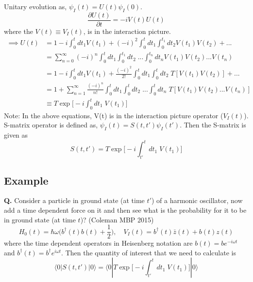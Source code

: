 \documentclass{article}
\begin{document}
Unitary evolution as, $\psi_I(t) = U(t) \psi_I(0)$.\\
\begin{equation}
    \frac{\partial U(t)}{\partial t} = -iV(t) U(t)
\end{equation}
where the $V(t) \equiv V_I (t)$, is in the interaction picture. 
\begin{equation}
\begin{split}
     \implies U(t) &= 1-i\int_0^t dt_1 V(t_1) +(-i)^2 \int_0^t dt_1 \int_0^{t_1} dt_2 V(t_1)  V(t_2)+... \\&= \sum_{n=0}^{\infty} (-i)^n \int_0^{t}dt_1\int_0^{t_1}dt_2 \; ... \int_0^{t_n}dt_n V(t_1)  V(t_2)... V(t_n) \\
     &= 1-i\int_0^t dt_1 V(t_1) +\frac{(-i)^2}{2!} \int_0^t dt_1 \int_0^{t} dt_2 \; T[V(t_1)  V(t_2)]+... \\&=1 + \sum_{n=1}^{\infty} \frac{(-i)^n}{n!} \int_0^{t}dt_1\int_0^{t}dt_2 \; ... \int_0^{t}dt_n \; T[V(t_1)  V(t_2)... V(t_n)] \\ &\equiv T\exp \bigg[-i\int_0^t dt_1\; V(t_1)\bigg]
\end{split}
\end{equation}
Note: In the above equations, V(t) is in the interaction picture operator ($V_I(t)$).\\
S-matrix operator is defined as,  $\psi_I(t) = S(t,t') \psi_I(t')$. Then the S-matrix is given as
\begin{equation}
	S(t,t') = T\exp \bigg[-i\int_{t'}^t dt_1\; V(t_1)\bigg]
\end{equation}

\subsection{Example}
\textbf{Q.} Consider a particle in ground state (at time $t'$) of a harmonic oscillator, now add a time dependent force on it and then see what is the probability for it to be in ground state (at time $t$)? (Coleman MBP 2015)\\
\begin{equation}
	H_0(t) = \hbar \omega \bigg( b^\dagger (t) b(t) + \frac{1}{2} \bigg), \quad V_I(t) = b^\dagger (t) \bar{z}(t) + b(t) z(t)
\end{equation}
where the time dependent operators in Heisenberg notation are $b(t) = b e^{-i\omega t}$ and $b^\dagger(t) = b^\dagger e^{i\omega t}$. Then the quantity of interest that we need to calculate is
\begin{equation}
	  \langle 0 | S(t,t') | 0 \rangle = \langle 0 | T\exp \bigg[-i\int_{t'}^t dt_1\; V(t_1)\bigg] | 0 \rangle
\end{equation}
\end{document}
